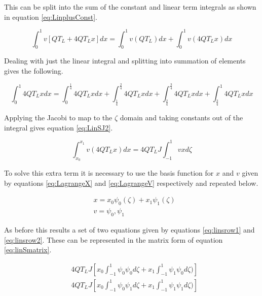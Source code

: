 \documentclass[11pt]{article}
\begin{document}
This can be split into the sum of the constant and linear term integrals as shown in equation \ref{eq:LinplusConst}.

\begin{equation}
\label{eq:LinplusConst}
\int_{0}^{1}v\left [ QT_L + 4QT_Lx \right ] dx = \int_{0}^{1}v (QT_L) dx + \int_{0}^{1}v(4QT_Lx) dx
\end{equation}

Dealing with just the linear integral and splitting into summation of elements gives the following.

\begin{equation*}
\int_0^1 4QT_Lx dx = \int_0^\frac{1}{4} 4QT_Lx dx + \int_\frac{1}{4}^\frac{2}{4}4QT_Lx  dx + \int_\frac{2}{4}^\frac{3}{4}  4QT_Lx dx + \int_\frac{3}{4}^1 4QT_Lx dx
\end{equation*}


Applying the Jacobi to map to the $\zeta$ domain and taking constants out of the integral gives equation \ref{eq:LinSJ2}.

\begin{equation}
\label{eq:LinSJ2}
\int_{x_0}^{x_1}v(4QT_Lx) dx = 4QT_L J\int_{-1}^1 vxd \zeta
\end{equation}

To solve this extra term it is necessary to use the basis function for $x$ and $v$ given by equations \ref{eq:LagrangeX} and \ref{eq:LagrangeV} respectively and repeated below.

\begin{align*}
&x = x_{0}\psi_{0}(\zeta) + x_1\psi_{1}(\zeta) \\
&v = \psi_{0}, \psi_{1}
\end{align*}

\pagebreak
As before this results a set of two equations given by equations \ref{eq:linsrow1} and \ref{eq:linsrow2}. These can be represented in the matrix form of equation \ref{eq:linSmatrix}.


\begin{subequations}
\label{eq:linSsim}
\begin{align}
&4QT_LJ \left  [x_0 \int_{-1}^{1} \psi_{0} \psi_{0} d \zeta + x_1 \int_{-1}^{1} \psi_{1} \psi_{0} d\zeta ) \right ] \label{eq:linsrow1} \\
&4QT_LJ  \left  [x_0 \int_{-1}^{1} \psi_{0} \psi_{1} d \zeta + x_1 \int_{-1}^{1} \psi_{1} \psi_{1} d\zeta ) \right ]  \label{eq:linsrow2} 
\end{align}
\end{subequations}
\end{document}
